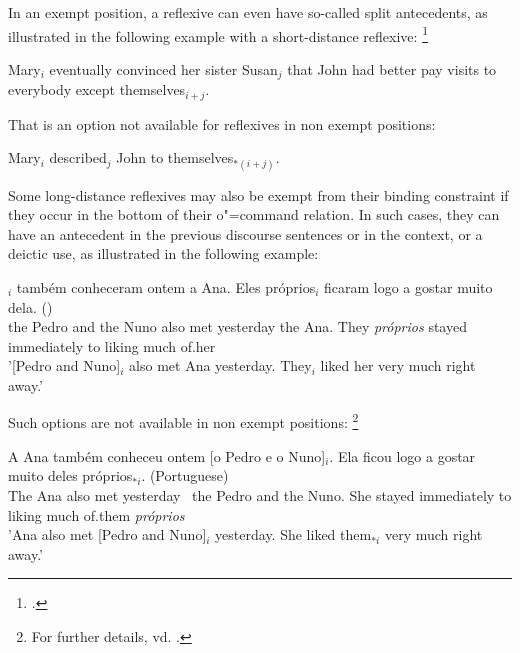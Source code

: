 \documentclass[output=paper
,modfonts
,nonflat]{langsci/langscibook}
\begin{document}
In an exempt position, a reflexive can even have so-called
split antecedents, as illustrated in the following example
with a short-distance reflexive:%
%
\footnote{
\citep[]{zribi:pview89}. 

}
%

\begin{exe}
\ex Mary$_{i}$ eventually convinced her sister Susan$_{j}$ that John had better 
pay visits to everybody except themselves$_{i+j}$.
\end{exe}

That is an option not available for reflexives in non exempt positions:

\begin{exe}
\ex Mary$_{i}$ described$_{j}$ John to themselves$_{*(i+j)}$.
\end{exe}


Some long-distance reflexives may also be exempt from their binding constraint if
they occur in the bottom of their o"=command relation. In such cases, they
can have an antecedent in the previous discourse sentences or
in the context, or a deictic use, as illustrated in the following example:


\begin{exe}
\ex
{}$_{i}$ tamb\'{e}m conheceram ontem a Ana. Eles pr\'{o}prios$_{i}$
ficaram logo a gostar muito dela. ()\\ 
the Pedro and the Nuno also met yesterday the Ana. They {\em pr\'{o}prios} stayed immediately to
liking much of.her\\
\trans '[Pedro and Nuno]$_{i}$ also met Ana yesterday. They$_{i}$ liked her very much right
away.'
\end{exe}

Such options are not available in non exempt positions:%
%
\footnote{
For further details, vd. \citep{branco:ldrefl99}.
}
%


\begin{exe}
\label{portugueseLDreflexive}
\ex
\gll  A Ana tamb\'{e}m conheceu ontem [o Pedro e o Nuno]$_{i}$. Ela ficou logo a gostar muito
deles pr\'{o}prios$_{*i}$. (Portuguese)\\ 
The Ana also met yesterday \mbox{ }the Pedro and the Nuno. She stayed immediately to liking much of.them
{\em pr\'{o}prios}\\
\trans 'Ana also met [Pedro and Nuno]$_{i}$ yesterday. She liked them$_{*i}$ very much right
away.'
\end{exe}
\end{document}
